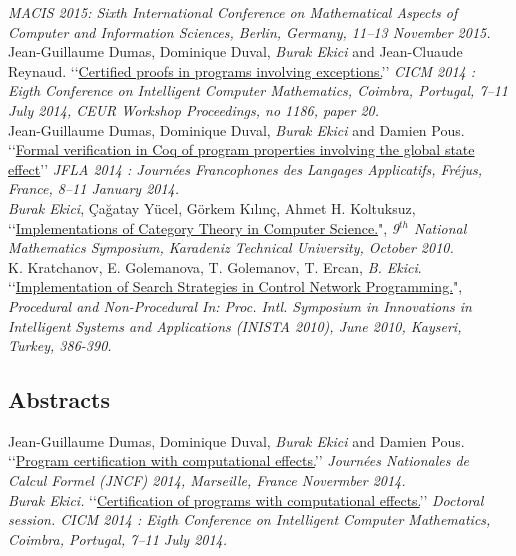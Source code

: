 \documentclass[10pt, a4paper]{article}
\newcommand{\years}[1]{\marginnote{\scriptsize #1}}
\begin{document}
\emph{MACIS 2015: Sixth International Conference on Mathematical Aspects of Computer and Information Sciences, Berlin,
Germany, 11–13 November 2015.}
\\[0.25cm]
\years{\normalsize2014}Jean-Guillaume Dumas, Dominique Duval, \emph{Burak Ekici} and Jean-Cluaude Reynaud. \lq\lq{}\href{https://hal.archives-ouvertes.fr/hal-00867237}{Certified proofs in programs involving exceptions.}\rq\rq{} \textit{
CICM 2014 : Eigth Conference on Intelligent Computer Mathematics, Coimbra, Portugal, 7--11 July 2014,
CEUR Workshop Proceedings, no 1186, paper 20. }\\[0.25cm]
\years{\normalsize2014}Jean-Guillaume Dumas, Dominique Duval, \emph{Burak Ekici} and Damien Pous. \lq\lq{\href{https://hal.archives-ouvertes.fr/hal-00869230}{Formal verification in Coq of program properties involving the global state effect}}\rq\rq{} \textit{JFLA 2014 : Journées Francophones des Langages Applicatifs, Fréjus, France, 8--11 January 2014. }\\[0.25cm]
\years{\normalsize2010} \emph{Burak Ekici}, Çağatay Yücel, Görkem Kılınç, Ahmet H. Koltuksuz, \lq\lq{}\href{http://ekiciburak.github.io/}{Implementations of Category Theory in Computer Science.}", \emph{9$^{th}$ National Mathematics Symposium, Karadeniz Technical University, October 2010.}\\[0.25cm]
\years{\normalsize2010} K. Kratchanov, E. Golemanova, T. Golemanov, T. Ercan, \emph{B. Ekici}. \lq\lq{}\href{http://arxiv.org/abs/1412.4184}{Implementation of Search Strategies in Control Network Programming.}", \emph{Procedural and Non-Procedural In: Proc. Intl. Symposium in Innovations in Intelligent Systems
and Applications (INISTA 2010), June 2010, Kayseri, Turkey, 386-390.}
\subsection*{Abstracts}
\years{\normalsize2014}Jean-Guillaume Dumas, Dominique Duval, \emph{Burak Ekici} and Damien Pous. \lq\lq{}\href{http://arxiv.org/abs/1411.7140}{Program certification with computational effects.}\rq\rq{} \textit{Journées Nationales de Calcul Formel (JNCF) 2014, Marseille, France Novermber 2014.}\\[0.25cm]
\years{\normalsize2014} \emph{Burak Ekici.} \lq\lq{}\href{http://arxiv.org/abs/1411.7139}{Certification of programs with computational effects.}\rq\rq{} \textit{Doctoral session. CICM 2014 : Eigth Conference on Intelligent Computer Mathematics, Coimbra, Portugal, 7--11 July 2014.}
\end{document}
